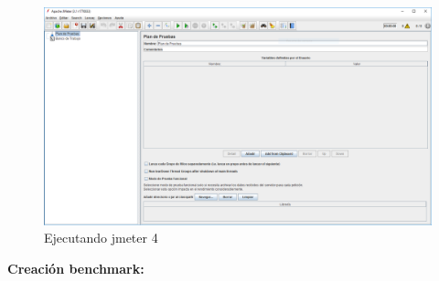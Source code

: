 \begin{enumerate}
	\begin{figure}[H] %
		\centering
		\includegraphics[scale=0.4]{pics/4}  %
		\caption{Ejecutando jmeter 4} \label{fig:jmt4}
	\end{figure}
\end{enumerate}

\textbf{Creación benchmark: }

